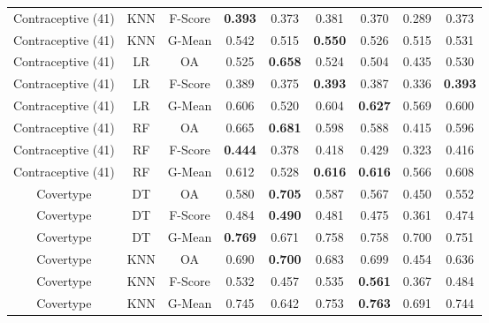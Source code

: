 \begin{longtable}{ccccccccc}
Contraceptive (41) &        KNN & F-Score & \textbf{0.393} &          0.373 &          0.381 &          0.370 &          0.289 &          0.373 \\
Contraceptive (41) &        KNN &  G-Mean &          0.542 &          0.515 & \textbf{0.550} &          0.526 &          0.515 &          0.531 \\
Contraceptive (41) &         LR &      OA &          0.525 & \textbf{0.658} &          0.524 &          0.504 &          0.435 &          0.530 \\
Contraceptive (41) &         LR & F-Score &          0.389 &          0.375 & \textbf{0.393} &          0.387 &          0.336 & \textbf{0.393} \\
Contraceptive (41) &         LR &  G-Mean &          0.606 &          0.520 &          0.604 & \textbf{0.627} &          0.569 &          0.600 \\
Contraceptive (41) &         RF &      OA &          0.665 & \textbf{0.681} &          0.598 &          0.588 &          0.415 &          0.596 \\
Contraceptive (41) &         RF & F-Score & \textbf{0.444} &          0.378 &          0.418 &          0.429 &          0.323 &          0.416 \\
Contraceptive (41) &         RF &  G-Mean &          0.612 &          0.528 & \textbf{0.616} & \textbf{0.616} &          0.566 &          0.608 \\
         Covertype &         DT &      OA &          0.580 & \textbf{0.705} &          0.587 &          0.567 &          0.450 &          0.552 \\
         Covertype &         DT & F-Score &          0.484 & \textbf{0.490} &          0.481 &          0.475 &          0.361 &          0.474 \\
         Covertype &         DT &  G-Mean & \textbf{0.769} &          0.671 &          0.758 &          0.758 &          0.700 &          0.751 \\
         Covertype &        KNN &      OA &          0.690 & \textbf{0.700} &          0.683 &          0.699 &          0.454 &          0.636 \\
         Covertype &        KNN & F-Score &          0.532 &          0.457 &          0.535 & \textbf{0.561} &          0.367 &          0.484 \\
         Covertype &        KNN &  G-Mean &          0.745 &          0.642 &          0.753 & \textbf{0.763} &          0.691 &          0.744 \\

\end{longtable}
